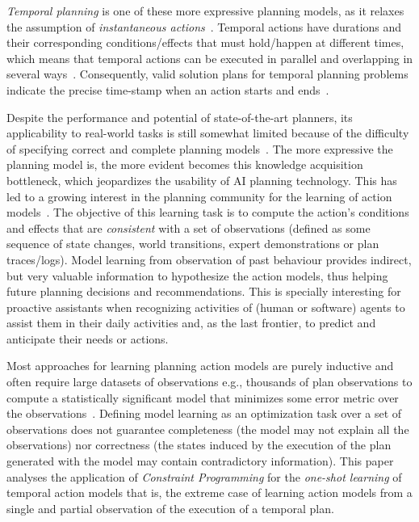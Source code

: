 \documentclass[runningheads]{llncs}
\begin{document}
{\em Temporal planning} is one of these more expressive planning models, as it relaxes the assumption of {\em instantaneous actions}~\cite{fox2003pddl2}. Temporal actions have durations and their corresponding conditions/effects that must hold/happen at different times, which means that temporal actions can be executed in parallel and overlapping in several ways~\cite{cushing2007temporal}. Consequently, valid solution plans for temporal planning problems indicate the precise time-stamp when an action starts and ends~\cite{howey2004val}.

Despite the performance and potential of state-of-the-art planners, its applicability to real-world tasks is still somewhat limited because of the difficulty of specifying correct and complete planning models~\cite{kambhampati2007model}. The more expressive the planning model is, the more evident becomes this knowledge acquisition bottleneck, which jeopardizes the usability of AI planning technology. This has led to a growing interest in the planning community for the learning of action models~\cite{jimenez2012review}. The objective of this learning task is to compute the action's conditions and effects that are {\em consistent} with a set of observations (defined as some sequence of state changes, world transitions, expert demonstrations or plan traces/logs). Model learning from observation of past behaviour provides indirect, but very valuable information to hypothesize the action models, thus helping future planning decisions and recommendations. This is specially interesting for proactive assistants when recognizing activities of (human or software) agents to assist them in their daily activities and, as the last frontier, to predict and anticipate their needs or actions.

Most approaches for learning planning action models are purely inductive and often require large datasets of observations e.g., thousands of plan observations to compute a statistically significant model that minimizes some error metric over the observations~\cite{yang2007learning,MouraoZPS12,zhuo2013action,kuvcera2018louga}. Defining model learning as an optimization task over a set of observations does not guarantee completeness (the model may not explain all the observations) nor correctness (the states induced by the execution of the plan generated with the model may contain contradictory information). This paper analyses the application of {\em Constraint Programming} for the {\em one-shot learning} of temporal action models that is, the extreme case of learning action models from a single and partial observation of the execution of a temporal plan.
\end{document}
